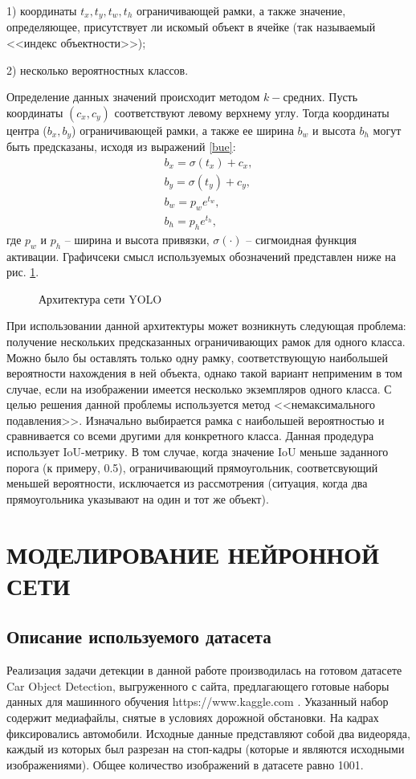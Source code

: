 \documentclass[14pt,a4paper]{extarticle}
\begin{document}
1) координаты $t_x, t_y, t_w, t_h$ ограничивающей рамки, а также значение, определяющее, присутствует ли искомый объект в ячейке (так называемый <<индекс объектности>>);

2) несколько вероятностных классов. 

Определение данных значений происходит методом $k-$средних. Пусть координаты $(c_x, c_y)$ соответствуют левому верхнему углу. Тогда координаты центра ($b_x, b_y$) ограничивающей рамки, а также ее ширина $b_w$ и высота $b_h$ могут быть предсказаны, исходя из выражений \eqref{bue}:
\begin{equation}
\begin{matrix}
b_x = \sigma(t_x) + c_x, \\
b_y = \sigma(t_y) + c_y,\\ \label{bue}
b_w = p_w e^{t_w},\\
b_h = p_h e^{t_h},
\end{matrix}
\end{equation}
где $p_w$ и $p_h$ -- ширина и высота привязки, $\sigma(\cdot)$ -- сигмоидная функция активации. Графичсеки смысл используемых обозначений представлен ниже на рис. \ref{yolbox}.

\begin{figure}[h]
\caption{Архитектура сети YOLO} \label{yolbox}
\end{figure}

При использовании данной архитектуры может возникнуть следующая проблема: получение нескольких предсказанных ограничивающих рамок для одного класса. Можно было бы оставлять только одну рамку, соответствующую наибольшей вероятности нахождения в ней объекта, однако такой вариант неприменим в том случае, если на изображении имеется несколько экземпляров одного класса. С целью решения данной проблемы используется метод <<немаксимального подавления>>. Изначально выбирается рамка с наибольшей вероятностью и сравнивается со всеми другими для конкретного класса. Данная продедура использует IoU-метрику. В том случае, когда значение IoU меньше заданного порога (к примеру, 0.5), ограничивающий прямоугольник, соответсвующий меньшей вероятности, исключается из рассмотрения (ситуация, когда два прямоугольника указывают на один и тот же объект).  

\newpage
\section{МОДЕЛИРОВАНИЕ НЕЙРОННОЙ СЕТИ}
\subsection{Описание используемого датасета}
Реализация задачи детекции в данной работе производилась на готовом датасете Car Object Detection, выгруженного с сайта, предлагающего готовые наборы данных для машинного обучения https://www.kaggle.com \cite{dataset}. Указанный набор содержит медиафайлы, снятые в условиях дорожной обстановки. На кадрах фиксировались автомобили. Исходные данные представляют собой два видеоряда, каждый из которых был разрезан на стоп-кадры (которые и являются исходными изображениями). Общее количество изображений в датасете равно 1001.  
\end{document}

